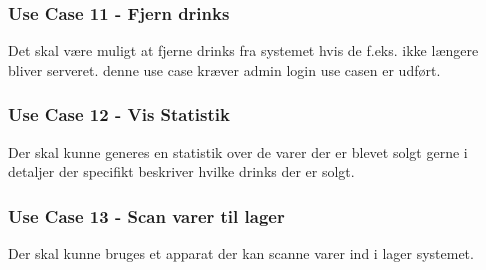 \subsubsection*{Use Case 11 - Fjern drinks}
Det skal være muligt at fjerne drinks fra systemet hvis de f.eks. ikke længere bliver serveret. denne use case kræver admin login use casen er udført.

\subsubsection*{Use Case 12 - Vis Statistik}
Der skal kunne generes en statistik over de varer der er blevet solgt gerne i detaljer der specifikt beskriver hvilke drinks der er solgt.

\subsubsection*{Use Case 13 - Scan varer til lager}
Der skal kunne bruges et apparat der kan scanne varer ind i lager systemet. 